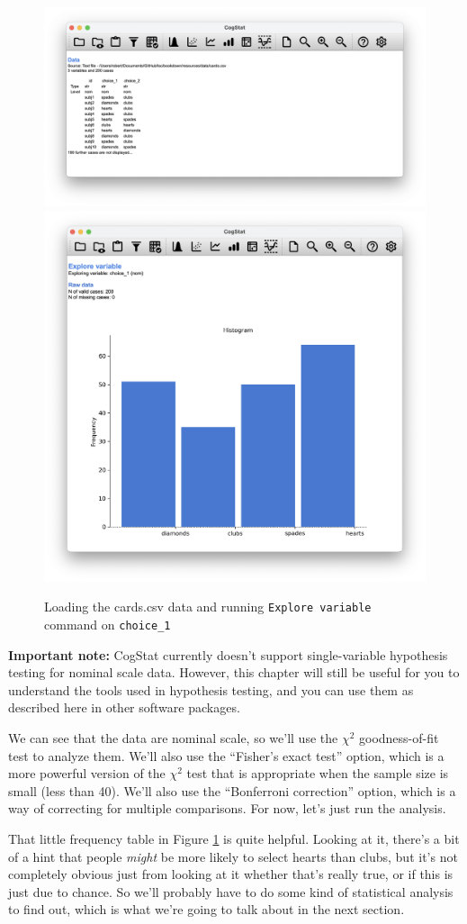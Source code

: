 \documentclass[
  11pt,
  a4paper,
  twoside,symmetric,openright]{book}
\theoremstyle{break}
\theoremstyle{break}
\begin{document}
\begin{figure}

{\centering \includegraphics[width=0.6\linewidth]{resources/image/cogstatloadcards} \includegraphics[width=0.6\linewidth]{resources/image/cogstatcardsdescrhisto} 

}

\caption{Loading the cards.csv data and running \texttt{Explore\ variable} command on \texttt{choice\_1}}\label{fig:cogstatloadcards}
\end{figure}

\textbf{Important note:}
CogStat currently doesn't support single-variable hypothesis testing for nominal scale data. However, this chapter will still be useful for you to understand the tools used in hypothesis testing, and you can use them as described here in other software packages.

We can see that the data are nominal scale, so we'll use the \(\chi^2\) goodness-of-fit test to analyze them. We'll also use the ``Fisher's exact test'' option, which is a more powerful version of the \(\chi^2\) test that is appropriate when the sample size is small (less than 40). We'll also use the ``Bonferroni correction'' option, which is a way of correcting for multiple comparisons. For now, let's just run the analysis.

That little frequency table in Figure \ref{fig:cogstatloadcards} is quite helpful. Looking at it, there's a bit of a hint that people \emph{might} be more likely to select hearts than clubs, but it's not completely obvious just from looking at it whether that's really true, or if this is just due to chance. So we'll probably have to do some kind of statistical analysis to find out, which is what we're going to talk about in the next section.
\end{document}
